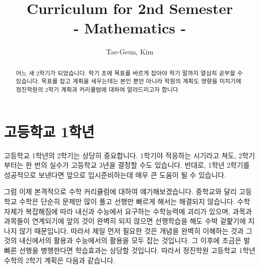 \documentclass[final]{IEEEphot}
\begin{document}
\title{Curriculum for 2nd Semester \\
- Mathematics -}

\author{Tae-Geun, Kim}


\maketitle


\begin{abstract}
 어느 새 2학기가 되었습니다. 학기 초에 목표를 바르게 잡아야 학기 말까지 열심히 공부할 수 있습니다. 목표를 잡고 계획을 세우는데는 본인 뿐만 아니라 학원의 계획도 영향을 미치기에
 정진학원의 2학기 계획과 커리큘럼에 대하여 알려드리고자 합니다. 
\end{abstract}


\section{고등학교 1학년}

\hspace{0.3cm} 고등학교 1학년의 2학기는 상당히 중요합니다. 1학기야 적응하는 시기라고 쳐도, 2학기 부터는 한 번의 실수가 고등학교 3년을 결정할 수도 있습니다. 반대로, 1학년 2학기를
성공적으로 보낸다면 앞으로 입시준비하는데 매우 큰 도움이 될 수 있습니다. 

그럼 이제 본격적으로 수학 커리큘럼에 대하여 얘기해보겠습니다. 중학교와 달리 고등학교 수학은 단순히 문제만 많이 풀고 선행만 빠르게 해서는 해결되지 않습니다. 수학 자체가 복잡해짐에 따라
내신과 수능에서 요구하는 수학능력에 괴리가 있으며, 과목과 과목들이 연계되기에 앞의 것이 완벽히 되지 않으면 선행학습을 해도 수박 겉핥기에 지나지 않기 때문입니다. 따라서 제일 먼저 필요한 것은
개념을 완벽히 이해하는 것과 그것의 내신에서의 활용과 수능에서의 활용을 모두 잡는 것입니다. 그 이후에 조금은 발빠른 선행을 병행한다면 학습효과는 상당할 것입니다. 
따라서 정진학원 고등학교 1학년 수학의 2학기 계획은 다음과 같습니다.
\end{document}

